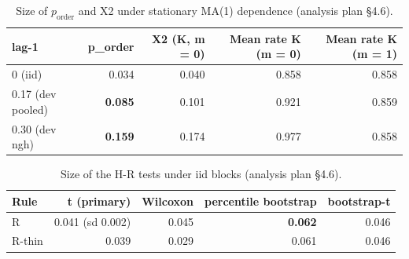 \begin{table}[htbp]
\centering\footnotesize
\caption{Size of $p_{\mathrm{order}}$ and X2 under stationary MA(1) dependence (analysis plan \S4.6).}\label{tab:sim3}
\begin{tabular}{lrrrr}
\toprule
lag-1 & p\_order & X2 (K, m = 0) & Mean rate K (m = 0) & Mean rate K (m = 1) \\
\midrule
0 (iid) & 0.034 & 0.040 & 0.858 & 0.858 \\
0.17 (dev pooled) & \textbf{0.085} & 0.101 & 0.921 & 0.859 \\
0.30 (dev ngh) & \textbf{0.159} & 0.174 & 0.977 & 0.858 \\
\bottomrule
\end{tabular}
\end{table}
\begin{table}[htbp]
\centering\footnotesize
\caption{Size of the H-R tests under iid blocks (analysis plan \S4.6).}\label{tab:sim4}
\begin{tabular}{lrrrr}
\toprule
Rule & t (primary) & Wilcoxon & percentile bootstrap & bootstrap-t \\
\midrule
R & 0.041 (sd 0.002) & 0.045 & \textbf{0.062} & 0.046 \\
R-thin & 0.039 & 0.029 & 0.061 & 0.046 \\
\bottomrule
\end{tabular}
\end{table}
